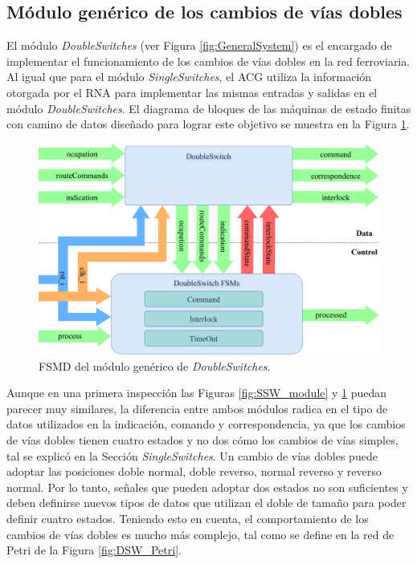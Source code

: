 \subsection{Módulo genérico de los cambios de vías dobles}
	\label{sec:ACG_dsw}
	
	El módulo \textit{DoubleSwitches} (ver Figura \ref{fig:GeneralSystem}) es el encargado de implementar el funcionamiento de los cambios de vías dobles en la red ferroviaria. Al igual que para el módulo \textit{SingleSwitches}, el ACG utiliza la información otorgada por el RNA para implementar las mismas entradas y salidas en el módulo \textit{DoubleSwitches}. El diagrama de bloques de las máquinas de estado finitas con camino de datos diseñado para lograr este objetivo se muestra en la Figura \ref{fig:DSW_module}.
	
	\begin{figure}[H]
		\centering
		\includegraphics[width=1\textwidth]{Figuras/DSW_module}
		\centering\caption{FSMD del módulo genérico de \textit{DoubleSwitches}.}
		\label{fig:DSW_module}
	\end{figure}
	
	Aunque en una primera inspección las Figuras \ref{fig:SSW_module} y \ref{fig:DSW_module} puedan parecer muy similares, la diferencia entre ambos módulos radica en el tipo de datos utilizados en la indicación, comando y correspondencia, ya que los cambios de vías dobles tienen cuatro estados y no dos cómo los cambios de vías simples, tal se explicó en la Sección \textit{SingleSwitches}. Un cambio de vías dobles puede adoptar las posiciones doble normal, doble reverso, normal reverso y reverso normal. Por lo tanto, señales que pueden adoptar dos estados no son suficientes y deben definirse nuevos tipos de datos que utilizan el doble de tamaño para poder definir cuatro estados. Teniendo esto en cuenta, el comportamiento de los cambios de vías dobles es mucho más complejo, tal como se define en la red de Petri de la Figura \ref{fig:DSW_Petri}.
	
